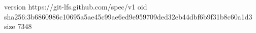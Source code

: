 version https://git-lfs.github.com/spec/v1
oid sha256:3b6860986c10695a5ae45c99ae6ed9e959709ded32eb44dbf6b9f31b8c60a1d3
size 7348
